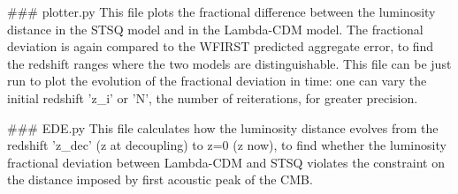 ### plotter.py
This file plots the fractional difference between the luminosity distance in the STSQ model and in the Lambda-CDM model. The fractional deviation is again compared to the WFIRST predicted aggregate error, to find the redshift ranges where the two models are distinguishable. This file can be just run to plot the evolution of the fractional deviation in time: one can vary the initial redshift 'z_i' or 'N', the number of reiterations, for greater precision.

### EDE.py
This file calculates how the luminosity distance evolves from the redshift 'z_dec' (z at decoupling) to z=0 (z now), to find whether the luminosity fractional deviation between Lambda-CDM and STSQ violates the constraint on the distance imposed by first acoustic peak of the CMB. 
